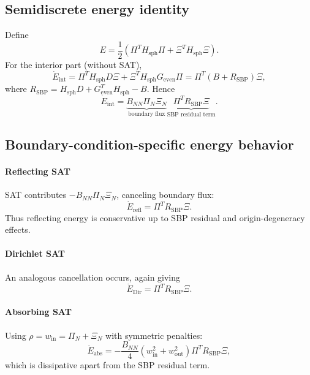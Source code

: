 \documentclass[
  aps,
  pre,
  reprint,
  superscriptaddress,
  nofootinbib
]{revtex4-2}
\newcommand{\Ge}{G_{\mathrm{even}}}
\newcommand{\Hs}{H_{\mathrm{sph}}}
\newcommand{\Rsbp}{R_{\mathrm{SBP}}}
\begin{document}
\subsection{Semidiscrete energy identity}
Define
\begin{equation}
E = \frac{1}{2}\left(\Pi^T\Hs\Pi+\Xi^T\Hs\Xi\right).
\end{equation}
For the interior part (without SAT),
\begin{equation}
\dot E_{\mathrm{int}}
= \Pi^T\Hs D\Xi + \Xi^T\Hs\Ge\Pi
= \Pi^T(B+\Rsbp)\Xi,
\end{equation}
where $\Rsbp=\Hs D+\Ge^T\Hs-B$.
Hence
\begin{equation}
\dot E_{\mathrm{int}}=\underbrace{B_{NN}\Pi_N\Xi_N}_{\text{boundary flux}}
\underbrace{\Pi^T\Rsbp\Xi}_{\text{SBP residual term}}.
\end{equation}

\subsection{Boundary-condition-specific energy behavior}
\paragraph*{Reflecting SAT}
SAT contributes $-B_{NN}\Pi_N\Xi_N$, canceling boundary flux:
\begin{equation}
\dot E_{\mathrm{refl}}=\Pi^T\Rsbp\Xi.
\end{equation}
Thus reflecting energy is conservative up to SBP residual and origin-degeneracy effects.

\paragraph*{Dirichlet SAT}
An analogous cancellation occurs, again giving
\begin{equation}
\dot E_{\mathrm{Dir}}=\Pi^T\Rsbp\Xi.
\end{equation}

\paragraph*{Absorbing SAT}
Using $\rho=w_{\mathrm{in}}=\Pi_N+\Xi_N$ with symmetric penalties:
\begin{equation}
\dot E_{\mathrm{abs}}
=
-\frac{B_{NN}}{4}\left(w_{\mathrm{in}}^2+w_{\mathrm{out}}^2\right)
\Pi^T\Rsbp\Xi,
\end{equation}
which is dissipative apart from the SBP residual term.
\end{document}

